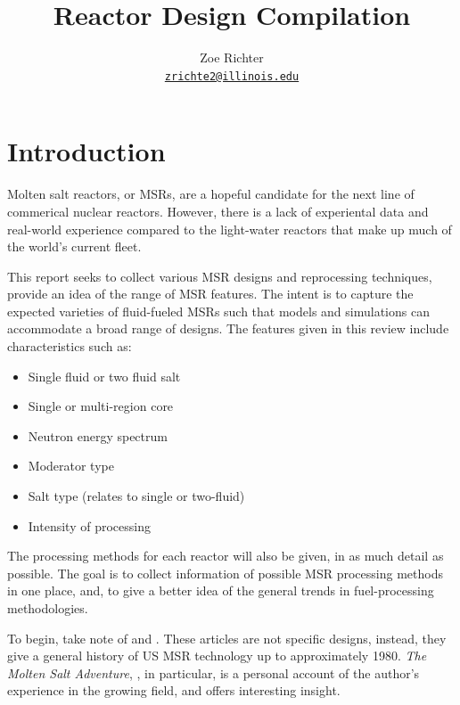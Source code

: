 \documentclass[letterpaper]{article}
\author{Zoe Richter
        \\ \href{mailto:zrichte2@illinois.edu}{\texttt{zrichte2@illinois.edu}}
}
\title{Reactor Design Compilation}
\begin{document}
\begin{titlepage}
\maketitle
\thispagestyle{empty}
\end{titlepage}

\section{Introduction}
Molten salt reactors, or MSRs, are a hopeful candidate for the next line of commerical nuclear reactors.  However, there is a lack of experiental data and real-world experience compared to the light-water reactors that make up much of the world's current fleet.

This report seeks to collect various MSR designs and reprocessing techniques, provide an idea of the range of MSR features.  The intent is to capture the expected varieties of fluid-fueled MSRs such that models and simulations can accommodate a broad range of designs.  The features given in this review include characteristics such as:

\begin{itemize}
\item Single fluid or two fluid salt
\item Single or multi-region core
\item Neutron energy spectrum
\item Moderator type
\item Salt type (relates to single or two-fluid)
\item Intensity of processing
\end{itemize}

The processing methods for each reactor will also be given, in as much detail as possible.  The goal is to collect information of possible MSR processing methods in one place, and, to give a better idea of the general trends in fuel-processing methodologies.

To begin, take note of \cite{macpherson_molten_1985} and \cite{rosenthal_molten-salt_1970}.  These articles are not specific designs, instead, they give a general history of US MSR technology up to approximately 1980. \emph{The Molten Salt Adventure}, \cite{macpherson_molten_1985}, in particular, is a personal account of the author's experience in the growing field, and offers interesting insight.\\
\end{document}
